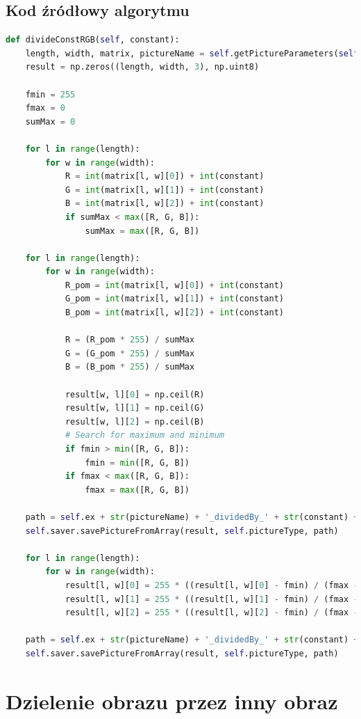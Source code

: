 \documentclass[a4paper,12pt, titlepage]{report}
\begin{document}
\subsection*{Kod źródłowy algorytmu}
\begin{lstlisting}[language=Python]
def divideConstRGB(self, constant):
    length, width, matrix, pictureName = self.getPictureParameters(self.pic1)
    result = np.zeros((length, width, 3), np.uint8)

    fmin = 255
    fmax = 0
    sumMax = 0

    for l in range(length):
        for w in range(width):
            R = int(matrix[l, w][0]) + int(constant)
            G = int(matrix[l, w][1]) + int(constant)
            B = int(matrix[l, w][2]) + int(constant)
            if sumMax < max([R, G, B]):
                sumMax = max([R, G, B])

    for l in range(length):
        for w in range(width):
            R_pom = int(matrix[l, w][0]) + int(constant)
            G_pom = int(matrix[l, w][1]) + int(constant)
            B_pom = int(matrix[l, w][2]) + int(constant)

            R = (R_pom * 255) / sumMax
            G = (G_pom * 255) / sumMax
            B = (B_pom * 255) / sumMax

            result[w, l][0] = np.ceil(R)
            result[w, l][1] = np.ceil(G)
            result[w, l][2] = np.ceil(B)
            # Search for maximum and minimum
            if fmin > min([R, G, B]):
                fmin = min([R, G, B])
            if fmax < max([R, G, B]):
                fmax = max([R, G, B])

    path = self.ex + str(pictureName) + '_dividedBy_' + str(constant) + '.png'
    self.saver.savePictureFromArray(result, self.pictureType, path)

    for l in range(length):
        for w in range(width):
            result[l, w][0] = 255 * ((result[l, w][0] - fmin) / (fmax - fmin))
            result[l, w][1] = 255 * ((result[l, w][1] - fmin) / (fmax - fmin))
            result[l, w][2] = 255 * ((result[l, w][2] - fmin) / (fmax - fmin))

    path = self.ex + str(pictureName) + '_dividedBy_' + str(constant) + '_normalized.png'
    self.saver.savePictureFromArray(result, self.pictureType, path)
\end{lstlisting}

\section{Dzielenie obrazu przez inny obraz}
\end{document}
